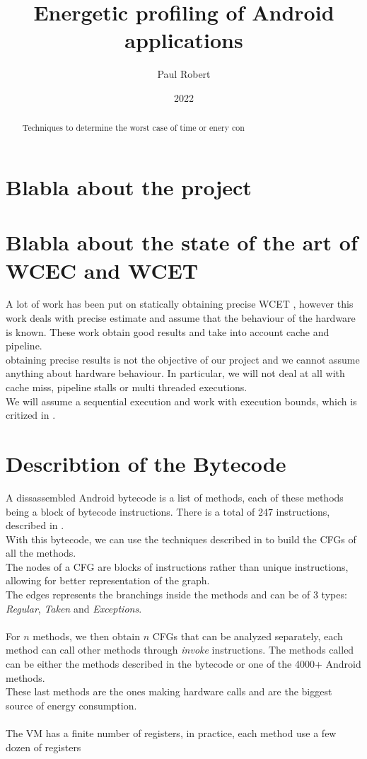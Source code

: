 \documentclass{article}
\title{Energetic profiling of Android applications}
\author{Paul Robert}
\date{2022}
\begin{document}
\maketitle

\begin{abstract}
    Techniques to determine the worst case of time or enery con
\end{abstract}
    
\section*{Blabla about the project}

\section*{Blabla about the state of the art of WCEC and WCET}

A lot of work has been put on statically obtaining precise WCET \cite{wilhelm_abstract_2008}, however this work deals with precise estimate and assume that the behaviour of the hardware is known. 
These work obtain good results and take into account cache and pipeline.\\
obtaining precise results is not the objective of our project and we cannot assume anything about hardware behaviour. In particular, we will not deal at all with cache miss, pipeline stalls or multi threaded executions.\\
We will assume a sequential execution and work with execution bounds, which is critized in \cite{wilhelm_real_2020}. 


\section*{Describtion of the Bytecode}
A dissassembled Android bytecode is a list of methods, each of these methods being a block of bytecode instructions.
There is a total of 247 instructions, described in \cite{noauthor_dalvik_nodate}.\\
With this bytecode, we can use the techniques described in \cite{zhao_analyzing_1999} to build the CFGs of all the methods.\\
The nodes of a CFG are blocks of instructions rather than unique instructions, allowing for better representation of the graph.\\
The edges represents the branchings inside the methods and can be of 3 types: \emph{Regular}, \emph{Taken} and \emph{Exceptions}.\\\\
For $n$ methods, we then obtain $n$ CFGs that can be analyzed separately, each method can call other methods through \emph{invoke} instructions. The methods called can be either the methods described in the bytecode or one of the 4000+ Android methods.\\
These last methods are the ones making hardware calls and are the biggest source of energy consumption.\\\\
The VM has a finite number of registers, in practice, each method use a few dozen of registers 
\end{document}
